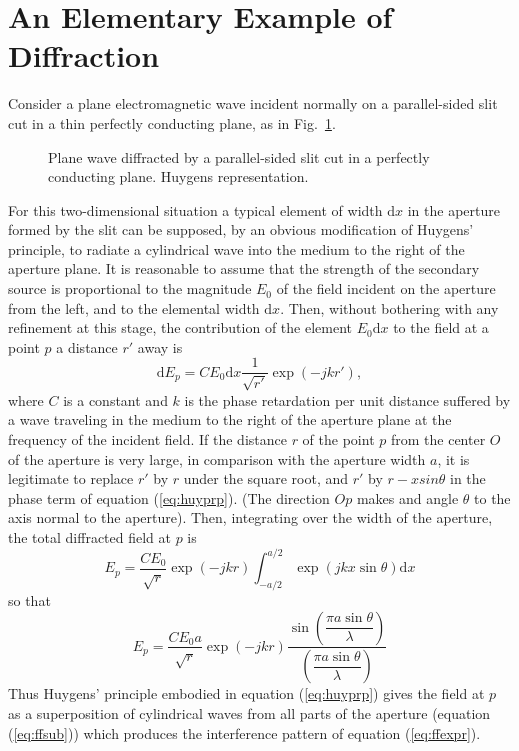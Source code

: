 \section{An Elementary Example of Diffraction}
\label{sec:eg}
Consider a plane electromagnetic wave incident normally on a parallel-sided slit cut in a thin perfectly conducting plane, as in Fig.\ \ref{fig:huymtd}.
\begin{figure}[htbp]
	\begin{center}
	\end{center}
	\caption{Plane wave diffracted by a parallel-sided slit cut in a perfectly conducting plane. Huygens representation.}
	\label{fig:huymtd}
\end{figure}
For this two-dimensional situation a typical element of width $\mathrm{d}x$ in the aperture formed by the slit can be supposed, by an obvious modification of Huygens' principle, to radiate a cylindrical wave into the medium to the right of the aperture plane. It is reasonable to assume that the strength of the secondary source is proportional to the magnitude $E_0$ of the field incident on the aperture from the left, and to the elemental width $\mathrm{d}x$. Then, without bothering with any refinement at this stage, the contribution of the element $E_0\mathrm{d}x$ to the field at a point $p$ a distance $r'$ away is
\begin{equation}
\mathrm{d}E_p = CE_0\mathrm{d}x \frac{1}{\sqrt{r'}} \exp(-jkr'), 
\label{eq:huyprp}
\end{equation}
where $C$ is a constant and $k$ is the phase retardation per unit distance suffered by a wave traveling in the medium to the right of the aperture plane at the frequency of the incident field. If the distance $r$ of the point $p$ from the center $O$ of the aperture is very large, in comparison with the aperture width $a$, it is legitimate to replace $r'$ by $r$ under the square root, and $r'$ by $r-xsin\theta$ in the phase term of equation (\ref{eq:huyprp}). (The direction $Op$ makes and angle $\theta$ to the axis normal to the aperture). Then, integrating over the width of the aperture, the total diffracted field at $p$ is
\begin{equation}
E_p = \frac{CE_0}{\sqrt{r}}\exp(-jkr)\int_{-a/2}^{a/2}\exp(jkx\sin\theta)\mathrm{d}x
\label{eq:ffsub}
\end{equation}
so that
\begin{equation}
E_p = \frac{CE_0a}{\sqrt{r}}\exp(-jkr)
	\frac{\sin({\dfrac{\pi a\sin\theta}{\lambda}})}
		 {(\dfrac{\pi a\sin\theta}{\lambda})}
\label{eq:ffexpr}
\end{equation}
Thus Huygens' principle embodied in equation (\ref{eq:huyprp}) gives the field at $p$ as a superposition of cylindrical waves from all parts of the aperture (equation (\ref{eq:ffsub})) which produces the interference pattern of equation (\ref{eq:ffexpr}).

